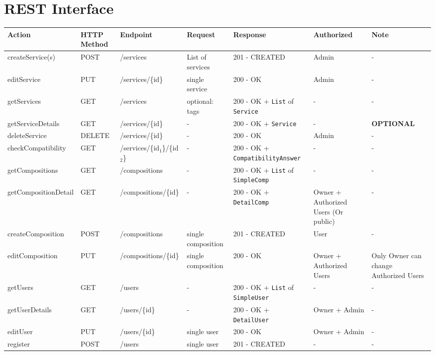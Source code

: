 \documentclass[11pt]{article}
\author{Christian Richter}
\date{\today}
\title{}
\begin{document}
\section{REST Interface}
\label{sec:org21e44af}
\begin{center}
\begin{tabular}{lllllll}
Action & HTTP Method & Endpoint & Request & Response & Authorized & Note\\
\hline
createService(s) & POST & /services & List of services & 201 - CREATED & Admin & -\\
editService & PUT & /services/\{id\} & single service & 200 - OK & Admin & -\\
getServices & GET & /services & optional: tags & 200 - OK + \texttt{List} of \texttt{Service} & - & -\\
getServiceDetails & GET & /services/\{id\} & - & 200 - OK + \texttt{Service} & - & \textbf{OPTIONAL}\\
deleteService & DELETE & /services/\{id\} & - & 200 - OK & Admin & -\\
\hline
checkCompatibility & GET & /services/\{id\(_{\text{1}}\)\}/\{id\(_{\text{2}}\)\} & - & 200 - OK + \texttt{CompatibilityAnswer} & - & -\\
\hline
getCompositions & GET & /compositions & - & 200 - OK + \texttt{List} of \texttt{SimpleComp} & - & -\\
getCompositionDetail & GET & /compositions/\{id\} & - & 200 - OK + \texttt{DetailComp} & Owner + Authorized Users (Or public) & -\\
createComposition & POST & /compositions & single composition & 201 - CREATED & User & -\\
editComposition & PUT & /compositions/\{id\} & single composition & 200 - OK & Owner + Authorized Users & Only Owner can change Authorized Users\\
\hline
getUsers & GET & /users & - & 200 - OK + \texttt{List} of \texttt{SimpleUser} & - & -\\
getUserDetails & GET & /users/\{id\} & - & 200 - OK + \texttt{DetailUser} & Owner + Admin & -\\
editUser & PUT & /users/\{id\} & single user & 200 - OK & Owner + Admin & -\\
register & POST & /users & single user & 201 - CREATED & - & -\\
\hline
\end{tabular}
\end{center}
\end{document}
